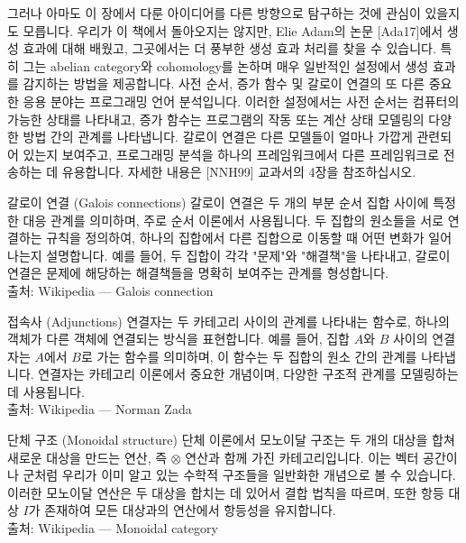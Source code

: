\documentclass[11pt, a4paper, twoside, openany]{book}
\begin{document}
\par\medskip
그러나 아마도 이 장에서 다룬 아이디어를 다른 방향으로 탐구하는 것에 관심이 있을지도 모릅니다. 우리가 이 책에서 돌아오지는 않지만, Elie Adam\hspace{0pt}의 논문 [Ada17]에서 생성 효과에 대해 배웠고, 그곳에서는 더 풍부한 생성 효과 처리를 찾을 수 있습니다. 특히 그는 abelian category\hspace{0pt}와 cohomology\hspace{0pt}를 논하며 매우 일반적인 설정에서 생성 효과를 감지하는 방법을 제공합니다.
사전 순서, 증가 함수 및 갈로이 연결의 또 다른 중요한 응용 분야는 프로그래밍 언어 분석입니다. 이러한 설정에서는 사전 순서는 컴퓨터의 가능한 상태를 나타내고, 증가 함수는 프로그램의 작동 또는 계산 상태 모델링의 다양한 방법 간의 관계를 나타냅니다. 갈로이 연결은 다른 모델들이 얼마나 가깝게 관련되어 있는지 보여주고, 프로그래밍 분석을 하나의 프레임워크에서 다른 프레임워크로 전송하는 데 유용합니다. 자세한 내용은 [NNH99] 교과서의 4\hspace{0pt}장을 참조하십시오.

\begin{deepresearch}{갈로이 연결 (Galois connections)}
갈로이 연결은 두 개의 부분 순서 집합 사이에 특정한 대응 관계를 의미하며, 주로 순서 이론에서 사용됩니다.  두 집합의 원소들을 서로 연결하는 규칙을 정의하여, 하나의 집합에서 다른 집합으로 이동할 때 어떤 변화가 일어나는지 설명합니다. 예를 들어, 두 집합이 각각 "문제"와 "해결책"을 나타내고, 갈로이 연결은 문제에 해당하는 해결책들을 명확히 보여주는 관계를 형성합니다.
\\[4pt]{\footnotesize\color{ctgray} 출처: Wikipedia — Galois connection}
\end{deepresearch}

\begin{deepresearch}{접속사 (Adjunctions)}
연결자는 두 카테고리 사이의 관계를 나타내는 함수로, 하나의 객체가 다른 객체에 연결되는 방식을 표현합니다. 예를 들어, 집합 $A$와 $B$ 사이의 연결자는 $A$에서 $B$로 가는 함수를 의미하며, 이 함수는 두 집합의 원소 간의 관계를 나타냅니다.  연결자는 카테고리 이론에서 중요한 개념이며, 다양한 구조적 관계를 모델링하는 데 사용됩니다.
\\[4pt]{\footnotesize\color{ctgray} 출처: Wikipedia — Norman Zada}
\end{deepresearch}

\begin{deepresearch}{단체 구조 (Monoidal structure)}
단체 이론에서 모노이달 구조는 두 개의 대상을 합쳐 새로운 대상을 만드는 연산, 즉 $⊗$ 연산과 함께 가진 카테고리입니다.  이는 벡터 공간이나 군처럼 우리가 이미 알고 있는 수학적 구조들을 일반화한 개념으로 볼 수 있습니다. 이러한 모노이달 연산은 두 대상을 합치는 데 있어서 결합 법칙을 따르며, 또한 항등 대상 $I$가 존재하여 모든 대상과의 연산에서 항등성을 유지합니다.
\\[4pt]{\footnotesize\color{ctgray} 출처: Wikipedia — Monoidal category}
\end{deepresearch}
\end{document}
